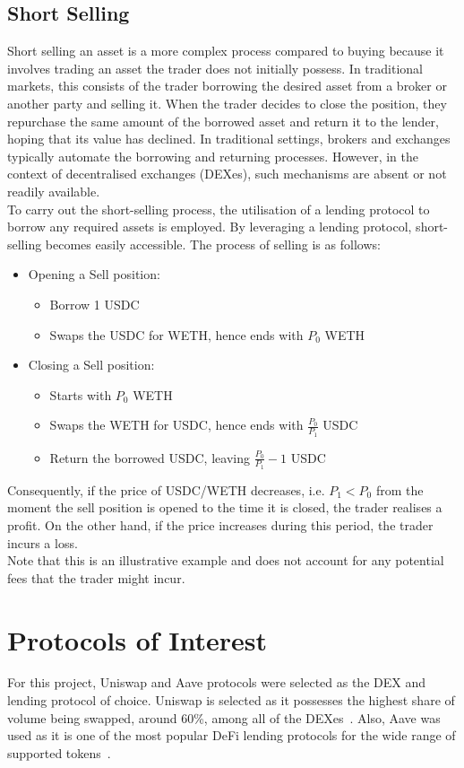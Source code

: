 \subsection{Short Selling}
Short selling an asset is a more complex process compared to buying because it involves trading an asset the trader does not initially possess. In traditional markets, this consists of the trader borrowing the desired asset from a broker or another party and selling it. When the trader decides to close the position, they repurchase the same amount of the borrowed asset and return it to the lender, hoping that its value has declined. In traditional settings, brokers and exchanges typically automate the borrowing and returning processes. However, in the context of decentralised exchanges (DEXes), such mechanisms are absent or not readily available.
\\[3mm]
To carry out the short-selling process, the utilisation of a lending protocol to borrow any required assets is employed. By leveraging a lending protocol, short-selling becomes easily accessible. The process of selling is as follows:
\begin{itemize}
    \item Opening a Sell position:\begin{itemize}
        \item Borrow 1 USDC
        \item Swaps the USDC for WETH, hence ends with $P_0$ WETH
    \end{itemize}
    \item Closing a Sell position:\begin{itemize}
        \item Starts with $P_0$ WETH
        \item Swaps the WETH for USDC, hence ends with $\frac{P_0}{P_1}$ USDC
        \item Return the borrowed USDC, leaving $\frac{P_0}{P_1} - 1$ USDC
    \end{itemize}
\end{itemize}
Consequently, if the price of USDC/WETH decreases, i.e. $P_1 < P_0$ from the moment the sell position is opened to the time it is closed, the trader realises a profit. On the other hand, if the price increases during this period, the trader incurs a loss.
\\[3mm]
Note that this is an illustrative example and does not account for any potential fees that the trader might incur.


\section{Protocols of Interest}
For this project, Uniswap and Aave protocols were selected as the DEX and lending protocol of choice. Uniswap is selected as it possesses the highest share of volume being swapped, around 60\%, among all of the DEXes~\cite{noauthor_defi_nodate}. Also, Aave was used as it is one of the most popular DeFi lending protocols for the wide range of supported tokens~\cite{noauthor_top_2023}.

